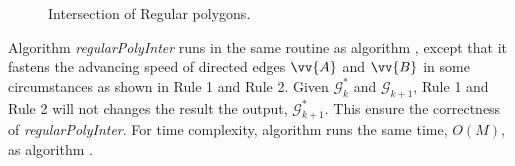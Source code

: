 \begin{figure}[tb!]
\begin{center}
{\small
\begin{minipage}{3.36in}
\myhrule
\vspace{-1ex}
\vspace{-2ex}
\myhrule
\end{minipage}
}
\end{center}
\vspace{-2ex}
\caption{\small Intersection of Regular polygons.}
\label{alg:r-poly-inter}
\vspace{-2ex}
\end{figure}





Algorithm \emph{regularPolyInter} runs in the same routine as algorithm \cpia, except that it fastens the advancing speed of directed edges $\vv{A}$ and $\vv{B}$ in some circumstances as shown in Rule 1 and Rule 2. Given $\mathcal{G}^*_k$ and $\mathcal{G}_{k+1}$,  Rule 1 and Rule 2 will not changes the result the output, \ie $\mathcal{G}^*_{k+1}$. This ensure the correctness of \emph{regularPolyInter}.
For time complexity, algorithm \rpia runs the same time, $O(M)$, as algorithm \cpia.


